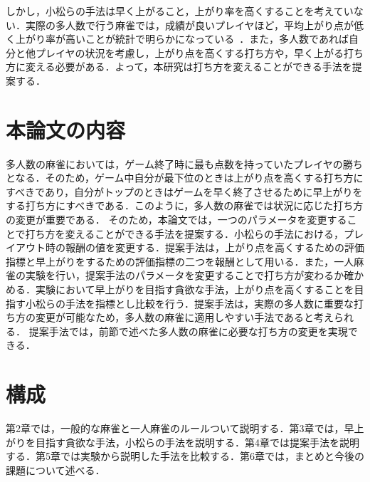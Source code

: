 しかし，小松らの手法は早く上がること，上がり率を高くすることを考えていない．実際の多人数で行う麻雀では，成績が良いプレイヤほど，平均上がり点が低く上がり率が高いことが統計で明らかになっている~\cite{kagaku}．また，多人数であれば自分と他プレイヤの状況を考慮し，上がり点を高くする打ち方や，早く上がる打ち方に変える必要がある．よって，本研究は打ち方を変えることができる手法を提案する．

\section{本論文の内容}
多人数の麻雀においては，ゲーム終了時に最も点数を持っていたプレイヤの勝ちとなる．そのため，ゲーム中自分が最下位のときは上がり点を高くする打ち方にすべきであり，自分がトップのときはゲームを早く終了させるために早上がりをする打ち方にすべきである．このように，多人数の麻雀では状況に応じた打ち方の変更が重要である．
そのため，本論文では，一つのパラメータを変更することで打ち方を変えることができる手法を提案する．小松らの手法における，プレイアウト時の報酬の値を変更する．提案手法は，上がり点を高くするための評価指標と早上がりをするための評価指標の二つを報酬として用いる．また，一人麻雀の実験を行い，提案手法のパラメータを変更することで打ち方が変わるか確かめる．実験において早上がりを目指す貪欲な手法，上がり点を高くすることを目指す小松らの手法を指標とし比較を行う．提案手法は，実際の多人数に重要な打ち方の変更が可能なため，多人数の麻雀に適用しやすい手法であると考えられる． 提案手法では，前節で述べた多人数の麻雀に必要な打ち方の変更を実現できる．\fi

\section{構成}
第2章では，一般的な麻雀と一人麻雀のルールついて説明する．第3章では，早上がりを目指す貪欲な手法，小松らの手法を説明する．第4章では提案手法を説明する．第5章では実験から説明した手法を比較する．第6章では，まとめと今後の課題について述べる．
